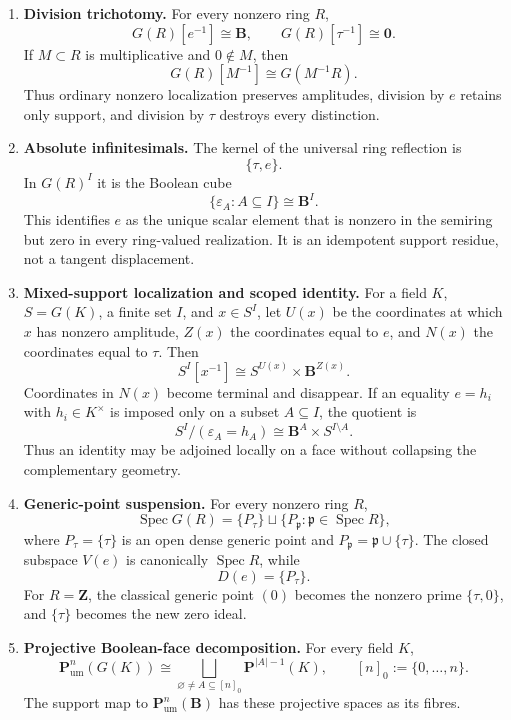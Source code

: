 \documentclass[11pt]{amsart}
\numberwithin{equation}{section}
\theoremstyle{definition}
\newcommand{\B}{\mathbf B}
\newcommand{\Z}{\mathbf Z}
\newcommand{\Spec}{\operatorname{Spec}}
\newcommand{\zero}{\mathbf 0}
\newcommand{\Pum}{\mathbf P_{\mathrm{um}}}
\newcommand{\eps}{\varepsilon}
\begin{document}
\begin{enumerate}[label=\textup{(\arabic*)},leftmargin=3.2em]
\item \textbf{Division trichotomy.}
For every nonzero ring $R$,
\[
G(R)[e^{-1}]\cong\B,
\qquad
G(R)[\tau^{-1}]\cong\zero.
\]
If $M\subset R$ is multiplicative and $0\notin M$, then
\[
G(R)[M^{-1}]\cong G(M^{-1}R).
\]
Thus ordinary nonzero localization preserves amplitudes, division by $e$ retains only support, and division by $\tau$ destroys every distinction.

\item \textbf{Absolute infinitesimals.}
The kernel of the universal ring reflection is
\[
\{\tau,e\}.
\]
In $G(R)^I$ it is the Boolean cube
\[
\{\eps_A:A\subseteq I\}\cong\B^I.
\]
This identifies $e$ as the unique scalar element that is nonzero in the semiring but zero in every ring-valued realization.  It is an idempotent support residue, not a tangent displacement.

\item \textbf{Mixed-support localization and scoped identity.}
For a field $K$, $S=G(K)$, a finite set $I$, and $x\in S^I$, let $U(x)$ be the coordinates at which $x$ has nonzero amplitude, $Z(x)$ the coordinates equal to $e$, and $N(x)$ the coordinates equal to $\tau$.  Then
\[
S^I[x^{-1}]
\cong
S^{U(x)}\times\B^{Z(x)}.
\]
Coordinates in $N(x)$ become terminal and disappear.  If an equality $e=h_i$ with $h_i\in K^\times$ is imposed only on a subset $A\subseteq I$, the quotient is
\[
S^I/(\eps_A=h_A)
\cong
\B^A\times S^{I\setminus A}.
\]
Thus an identity may be adjoined locally on a face without collapsing the complementary geometry.

\item \textbf{Generic-point suspension.}
For every nonzero ring $R$,
\[
\Spec G(R)=\{P_\tau\}\sqcup\{P_{\mathfrak p}:\mathfrak p\in\Spec R\},
\]
where $P_\tau=\{\tau\}$ is an open dense generic point and $P_{\mathfrak p}=\mathfrak p\cup\{\tau\}$.  The closed subspace $V(e)$ is canonically $\Spec R$, while
\[
D(e)=\{P_\tau\}.
\]
For $R=\Z$, the classical generic point $(0)$ becomes the nonzero prime $\{\tau,0\}$, and $\{\tau\}$ becomes the new zero ideal.

\item \textbf{Projective Boolean-face decomposition.}
For every field $K$,
\[
\Pum^n(G(K))
\cong
\bigsqcup_{\varnothing\neq A\subseteq[n]_0}
\mathbf P^{|A|-1}(K),
\qquad [n]_0:=\{0,\dots,n\}.
\]
The support map to $\Pum^n(\B)$ has these projective spaces as its fibres.


\end{enumerate}
\end{document}
